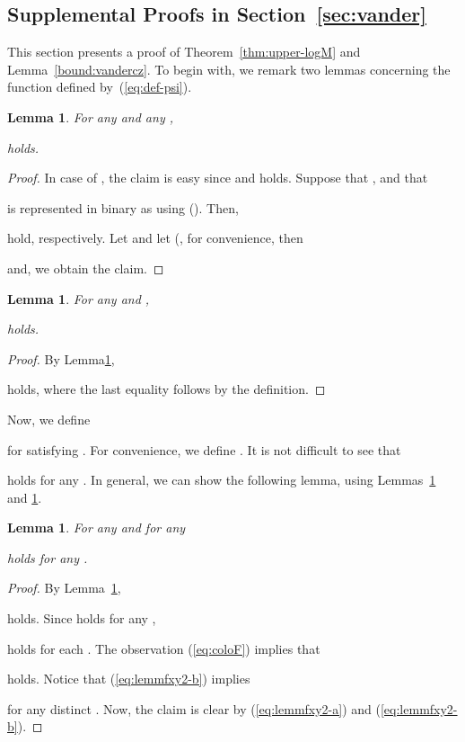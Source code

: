 \documentclass[letter, 11pt]{article}
\newcommand{\1}{\mbox{1}\hspace{-0.25em}\mbox{l}}
\newtheorem{lemma}[theorem]{Lemma}
\begin{document}
\subsection{Supplemental Proofs in Section~\ref{sec:vander}}\label{appendix:vander}
This section presents a proof of Theorem~\ref{thm:upper-logM} and Lemma~\ref{bound:vandercz}. 
To begin with, we remark two lemmas concerning the function  defined by~(\ref{eq:def-psi}). 
\begin{lemma}\label{lemmf2}
 For any  and any , 

 holds. 
\end{lemma}
\begin{proof}
 In case of , 
   the claim is easy 
  since
    and 
    holds. 
Suppose that , and that 
   
   is represented in binary as  
   using  (). 
 Then, 
 
  hold, respectively. 
 Let  and 
 let  (, for convenience, 
  then 

 and, we obtain the claim.
\end{proof}
\begin{lemma}\label{lemmf1}
 For any  and , 

holds. 
\end{lemma}
\begin{proof}
 By Lemma\ref{lemmf2}, 

  holds, where the last equality follows   by the definition. 
\end{proof}
Now, we define 

  for  satisfying . 
 For convenience, we define . 
It is not difficult to see that 

 holds for any . 
In general, we can show the following lemma, using Lemmas~\ref{lemmf2} and \ref{lemmf1}. 
\begin{lemma}\label{lemmfxy2}
For any  and for any 

 holds for any . 
\end{lemma}
\begin{proof}
 By Lemma~\ref{lemmf2}, 

  holds. 
 Since  holds for any , 

  holds for each . 
 The observation (\ref{eq:coloF}) implies that 

  holds. 
 Notice that (\ref{eq:lemmfxy2-b}) implies 

for any distinct . 
 Now, the claim is clear by (\ref{eq:lemmfxy2-a}) and (\ref{eq:lemmfxy2-b}). 
\end{proof}
\end{document}
